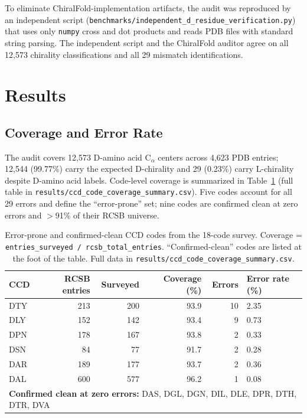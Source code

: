 \documentclass[11pt]{article}
\begin{document}
To eliminate ChiralFold-implementation artifacts, the audit was reproduced by an independent script (\texttt{benchmarks/independent\_d\_residue\_verification.py}) that uses only \texttt{numpy} cross and dot products and reads PDB files with standard string parsing. The independent script and the ChiralFold auditor agree on all 12{,}573 chirality classifications and all 29 mismatch identifications.

\section{Results}

\subsection{Coverage and Error Rate}

The audit covers 12{,}573 D-amino acid C$_\alpha$ centers across 4{,}623 PDB entries; 12{,}544 (99.77\%) carry the expected D-chirality and 29 (0.23\%) carry L-chirality despite D-amino acid labels. Code-level coverage is summarized in Table~\ref{tab:coverage} (full table in \texttt{results/ccd\_code\_coverage\_summary.csv}). Five codes account for all 29 errors and define the ``error-prone'' set; nine codes are confirmed clean at zero errors and $>$91\% of their RCSB universe.

\begin{table}[ht]
\centering
\caption{Error-prone and confirmed-clean CCD codes from the 18-code survey. Coverage = \texttt{entries\_surveyed / rcsb\_total\_entries}. ``Confirmed-clean'' codes are listed at the foot of the table. Full data in \texttt{results/ccd\_code\_coverage\_summary.csv}.}
\label{tab:coverage}
\begin{tabular}{lrrrrl}
\toprule
CCD & RCSB entries & Surveyed & Coverage (\%) & Errors & Error rate (\%) \\
\midrule
DTY & 213 & 200 & 93.9 & 10 & 2.35 \\
DLY & 152 & 142 & 93.4 & 9  & 0.73 \\
DPN & 178 & 167 & 93.8 & 2  & 0.33 \\
DSN & 84  & 77  & 91.7 & 2  & 0.28 \\
DAR & 189 & 177 & 93.7 & 2  & 0.36 \\
DAL & 600 & 577 & 96.2 & 1  & 0.08 \\
\midrule
\multicolumn{6}{l}{\textbf{Confirmed clean at zero errors:} DAS, DGL, DGN, DIL, DLE, DPR, DTH, DTR, DVA} \\
\bottomrule
\end{tabular}
\end{table}
\end{document}
